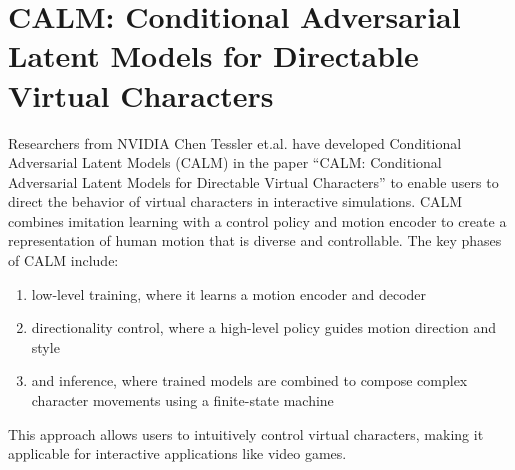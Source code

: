 \section{CALM: Conditional Adversarial Latent Models for Directable Virtual Characters}

Researchers from NVIDIA  Chen Tessler et.al. have developed Conditional Adversarial Latent Models (CALM)  in the paper ``CALM: Conditional Adversarial Latent Models for Directable Virtual Characters''\cite{CALM} to enable users to direct the behavior of virtual characters in interactive simulations. CALM combines imitation learning with a control policy and motion encoder to create a representation of human motion that is diverse and controllable. The key phases of CALM include:
\begin{enumerate}
    \item low-level training, where it learns a motion encoder and decoder
    \item directionality control, where a high-level policy guides motion direction and style
    \item and inference, where trained models are combined to compose complex character movements using a finite-state machine
\end{enumerate}
This approach allows users to intuitively control virtual characters, making it applicable for interactive applications like video games.